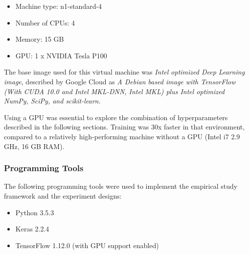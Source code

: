 \documentclass[../dropout-vs-batch-normalization.tex]{subfiles}
\begin{document}
\begin{itemize}
\item Machine type: n1-standard-4
\item Number of CPUs: 4
\item Memory: 15 GB
\item GPU: 1 x NVIDIA Tesla P100
\end{itemize}

The base image used for this virtual machine was \textit{Intel\textsuperscript{\textregistered} optimized Deep Learning image}, described by Google Cloud as \textit{A Debian based image with TensorFlow (With CUDA 10.0 and Intel\textsuperscript{\textregistered} MKL-DNN, Intel\textsuperscript{\textregistered} MKL) plus Intel\textsuperscript{\textregistered} optimized NumPy, SciPy, and scikit-learn.}

Using a GPU was essential to explore the combination of hyperparameters described in the following sections. Training was 30x faster in that environment, compared to a relatively high-performing machine without a GPU (Intel i7 2.9 GHz, 16 GB RAM).

\medskip
\subsubsection{Programming Tools}

The following programming tools were used to implement the empirical study framework and the experiment designs:

\begin{itemize}
\item Python 3.5.3
\item Keras 2.2.4
\item TensorFlow 1.12.0 (with GPU support enabled)
\end{itemize}
\end{document}

